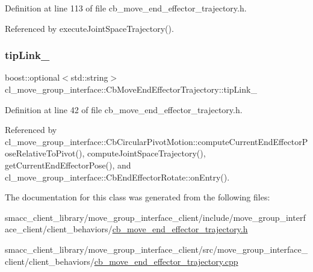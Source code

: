 Definition at line 113 of file cb\+\_\+move\+\_\+end\+\_\+effector\+\_\+trajectory.\+h.



Referenced by execute\+Joint\+Space\+Trajectory().

\mbox{\label{classcl__move__group__interface_1_1CbMoveEndEffectorTrajectory_a24c6c30b9b0761a61fa002d947bd3e11}} 
\subsubsection{\texorpdfstring{tip\+Link\+\_\+}{tipLink\_}}
{\footnotesize\ttfamily boost\+::optional$<$std\+::string$>$ cl\+\_\+move\+\_\+group\+\_\+interface\+::\+Cb\+Move\+End\+Effector\+Trajectory\+::tip\+Link\+\_\+}



Definition at line 42 of file cb\+\_\+move\+\_\+end\+\_\+effector\+\_\+trajectory.\+h.



Referenced by cl\+\_\+move\+\_\+group\+\_\+interface\+::\+Cb\+Circular\+Pivot\+Motion\+::compute\+Current\+End\+Effector\+Pose\+Relative\+To\+Pivot(), compute\+Joint\+Space\+Trajectory(), get\+Current\+End\+Effector\+Pose(), and cl\+\_\+move\+\_\+group\+\_\+interface\+::\+Cb\+End\+Effector\+Rotate\+::on\+Entry().



The documentation for this class was generated from the following files\+:\begin{DoxyCompactItemize}
\item 
smacc\+\_\+client\+\_\+library/move\+\_\+group\+\_\+interface\+\_\+client/include/move\+\_\+group\+\_\+interface\+\_\+client/client\+\_\+behaviors/\hyperlink{cb__move__end__effector__trajectory_8h}{cb\+\_\+move\+\_\+end\+\_\+effector\+\_\+trajectory.\+h}\item 
smacc\+\_\+client\+\_\+library/move\+\_\+group\+\_\+interface\+\_\+client/src/move\+\_\+group\+\_\+interface\+\_\+client/client\+\_\+behaviors/\hyperlink{cb__move__end__effector__trajectory_8cpp}{cb\+\_\+move\+\_\+end\+\_\+effector\+\_\+trajectory.\+cpp}\end{DoxyCompactItemize}
